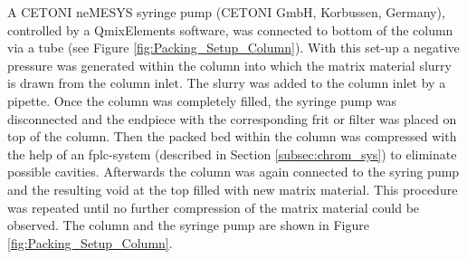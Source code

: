 A CETONI neMESYS syringe pump (CETONI GmbH, Korbussen, Germany), controlled by a QmixElements software, was connected to bottom of the column via a tube (see Figure \ref{fig:Packing_Setup_Column}). With this set-up a negative pressure was generated within the column into which the matrix material slurry is drawn from the column inlet. The slurry was added to the column inlet by a pipette. Once the column was completely filled, the syringe pump was disconnected and the endpiece with the corresponding frit or filter was placed on top of the column. Then the packed bed within the column was compressed with the help of an \gls{fplc}-system (described in Section \ref{subsec:chrom_sys}) to eliminate possible cavities. Afterwards the column was again connected to the syring pump and the resulting void at the top filled with new matrix material. This procedure was repeated until no further compression of the matrix material could be observed. The column and the syringe pump are shown in Figure \ref{fig:Packing_Setup_Column}.

